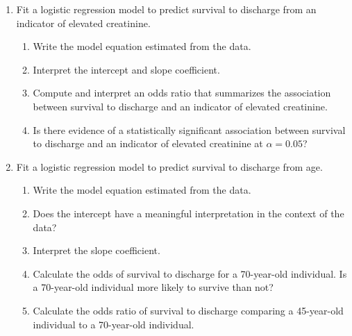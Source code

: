 \documentclass[letterpaper,12pt,twoside,]{pinp}
\begin{document}
\begin{enumerate}
\def\labelenumi{\arabic{enumi}.}
\setcounter{enumi}{3}
\item
  Fit a logistic regression model to predict survival to discharge from
  an indicator of elevated creatinine.

  \begin{enumerate}
  \def\labelenumii{\alph{enumii})}
  \item
    Write the model equation estimated from the data.
  \item
    Interpret the intercept and slope coefficient.
  \item
    Compute and interpret an odds ratio that summarizes the association
    between survival to discharge and an indicator of elevated
    creatinine.
  \item
    Is there evidence of a statistically significant association between
    survival to discharge and an indicator of elevated creatinine at
    \(\alpha = 0.05\)?
  \end{enumerate}
\item
  Fit a logistic regression model to predict survival to discharge from
  age.

  \begin{enumerate}
  \def\labelenumii{\alph{enumii})}
  \item
    Write the model equation estimated from the data.
  \item
    Does the intercept have a meaningful interpretation in the context
    of the data?
  \item
    Interpret the slope coefficient.
  \item
    Calculate the odds of survival to discharge for a 70-year-old
    individual. Is a 70-year-old individual more likely to survive than
    not?
  \item
    Calculate the odds ratio of survival to discharge comparing a
    45-year-old individual to a 70-year-old individual.
  \end{enumerate}
\end{enumerate}





\end{document}
